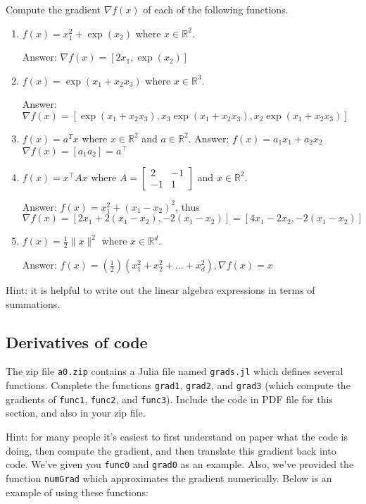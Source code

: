 \documentclass{article}
\def\blu#1{{\color{blu}#1}}
\def\norm#1{\|#1\|}
\def\R{\mathbb{R}}
\newcommand{\fig}[2]{\texttt{[image: a0f/\#2]}}
\begin{document}
\blu{Compute the gradient $\nabla f(x)$ of each of the following functions.}
\begin{enumerate}
\item $f(x) = x_1^2 + \exp(x_2)$ where $x \in \R^2$.

Answer: $\nabla f(x)=[2x_{1}, \exp(x_{2})]$

\item $f(x) = \exp(x_1 + x_2x_3)$ where $x \in \mathbb{R}^3$.

Answer: $\nabla f(x)=[\exp(x_1 + x_2x_3), x_{3}\exp(x_1 + x_2x_3), x_{2}\exp(x_1 + x_2x_3)]$

\item $f(x) = a^Tx$ where $x \in \R^2$ and $a \in \R^2$.
Answer: $f(x)=a_{1}x_{1}+a_{2}x_{2}$
$\nabla f(x) = [a_1 a_2]=a^\top$ 
 
\item $f(x) = x^\top A x$ where $A=\left[ \begin{array}{cc}
2 & -1 \\
 -1 & 1 \end{array} \right]$ and $x \in \mathbb{R}^2$.

Answer: $f(x)=x^{2}_{1}+(x_{1}-x_{2})^{2}$, thus $\nabla f(x)=[2x_{1}+2(x_{1}-x_{2}),  -2(x_{1}-x_{2})]=[4x_{1}-2x_{2},  -2(x_{1}-x_{2})]$

 \item $f(x) = \frac{1}{2}\norm{x}^2$ where $x \in \R^d$.

Answer: $f(x)=(\frac{1}{2})(x^2_{1}+x^2_{2}+ ... +x^2_{d}), \nabla f(x) = x$ 
 
\end{enumerate}


Hint: it is helpful to write out the linear algebra expressions in terms of summations.



\subsection{Derivatives of code}

The zip file \texttt{a0.zip} contains a Julia file named \texttt{grads.jl} which defines several functions. \blu{Complete the functions \texttt{grad1}, \texttt{grad2}, and \texttt{grad3} (which compute the gradients of \texttt{func1}, \texttt{func2}, and \texttt{func3})}. Include the code in PDF file for this section, and also in your zip file.

Hint: for many people it's easiest to first understand on paper what the code is doing, then compute
the gradient, and then translate this gradient back into code. We've given you \texttt{func0} and \texttt{grad0} as an example. Also, we've provided the function \texttt{numGrad} which approximates the gradient numerically. Below is an example of using these functions:\\
\end{document}
